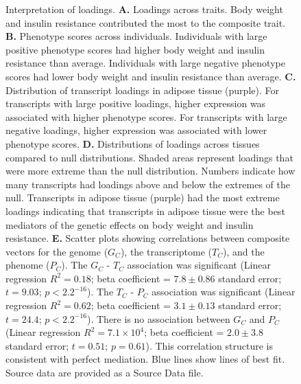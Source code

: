 \documentclass[
]{article}
\begin{document}
\begin{figure}[ht!]
\caption{Interpretation of loadings. \textbf{A.} Loadings across traits. 
Body weight and insulin resistance contributed the most 
to the composite trait. \textbf{B.} Phenotype scores across 
individuals. Individuals with large positive phenotype scores 
had higher body weight and insulin resistance than average. 
Individuals with large negative phenotype scores had lower 
body weight and insulin resistance than average. \textbf{C.} 
Distribution of transcript loadings in adipose tissue (purple). 
For transcripts with large positive loadings, higher expression 
was associated with higher phenotype scores. For transcripts 
with large negative loadings, higher expression was associated 
with lower phenotype scores. \textbf{D.} Distributions of loadings 
across tissues compared to null distributions. Shaded areas 
represent loadings that were more extreme than the null 
distribution. Numbers indicate how many transcripts had loadings 
above and below the extremes of the null. Transcripts in adipose 
tissue (purple) had the most extreme loadings indicating 
that transcripts in adipose tissue were the best mediators of the 
genetic effects on body weight and insulin resistance. \textbf{E.} 
Scatter plots showing correlations between composite vectors for 
the genome ($G_C$), the transcriptome ($T_C$), and the phenome 
($P_C$). The $G_C$ - $T_C$ association was significant 
(Linear regression $R^2 = 0.18$;  beta coefficient = $7.8\pm0.86$ 
standard error; $t = 9.03$; $p < 2.2^{-16}$). The $T_C$ - $P_C$ 
association was significant (Linear regression $R^2 = 0.62$;  
beta coefficient = $3.1\pm0.13$ standard error; $t = 24.4$; 
$p < 2.2^{-16}$). There is no association between $G_C$ and $P_C$
(Linear regression $R^2 = 7.1\times10^{4}$;  beta coefficient = 
$2.0\pm3.8$ standard error; $t = 0.51$; $p = 0.61$). This correlation 
structure is consistent with perfect mediation. Blue lines show
lines of best fit. Source data are provided as a Source Data file.
}
\label{fig:interpretation}
\end{figure}
\end{document}
